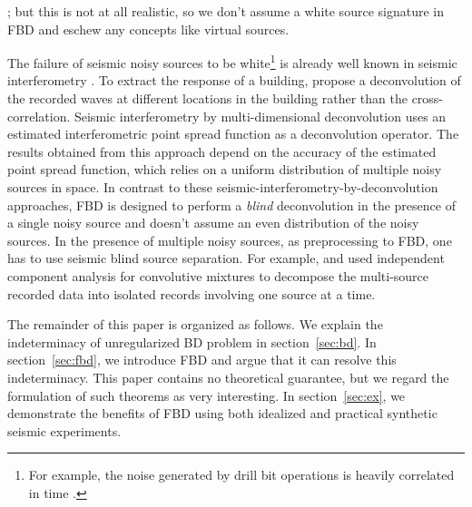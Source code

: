 \documentclass{article}
\theoremstyle{definition}
\begin{document}
{; but this is not at all realistic, so we 
don't assume a white source signature in FBD and eschew any concepts like virtual sources.
%

The {failure} %
of %
seismic {noisy sources} {to be white}\footnote{
For example,
the noise generated 
by
drill bit operations is heavily correlated 
in time \citep{gradl2012analysis, rector1991use, joyce2001introduction}.}
is already {well known} %
in seismic interferometry \citep{curtis2006seismic,vasconcelos2008interferometry1}.
%
To extract the response of a building,
\cite{snieder2006extracting} propose a deconvolution of the re\-corded 
waves at different locations
in the building 
rather than the cross-correlation.
%
%
Seismic interferometry by multi-dimen\-sional 
deconvolution \citep{wapenaar2008passive, wapenaar2011seismic,van2011controlled,broggini2014data}
uses an estimated interferometric point spread function as a deconvolution operator.
%
The results obtained from this approach depend on 
the accuracy of the estimated point spread function, which relies on 
a %
{uniform} distribution of 
multiple {noisy sources} in space.
%
In contrast to these  
seismic{-}interferometry{-}by{-}deconvolution approaches, 
FBD is designed to perform a \emph{blind} deconvolution in the presence of a single {noisy source} and 
doesn't assume an even distribution of the noisy sources.
%
In the presence of multiple {noisy sources}, %
as preprocessing to FBD,
one has to use
seismic blind source separation.
%
For example, \cite{makino2005blind} and \cite{bharadwaj2017deblending} used
independent component analysis for convolutive mixtures to 
decompose the multi-source recorded data into isolated records involving 
one source at a time.
%


The remainder of this paper is organized as follows.
%
We 
explain the indeterminacy of unregularized BD problem in section~\ref{sec:bd}.
%
In section~\ref{sec:fbd},
we introduce FBD and argue that it can
resolve
this indeterminacy.
%
This paper contains no theoretical guarantee,
but we regard the formulation of
such theorems 
as very interesting.
%
%
In section~\ref{sec:ex},
we demonstrate the benefits of FBD
using both idealized  
and practical synthetic  seismic experiments.
%
%
%


}
\end{document}
